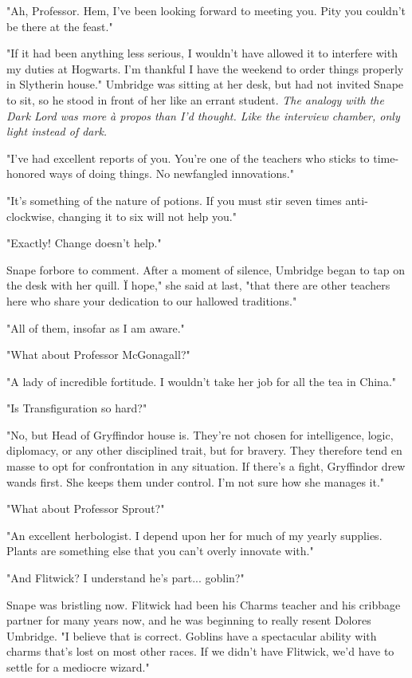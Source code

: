 \documentclass[a4paper,11pt]{article}
\begin{document}
"Ah, Professor. Hem, I've been looking forward to meeting you. Pity you couldn't be there at the feast."

"If it had been anything less serious, I wouldn't have allowed it to interfere with my duties at Hogwarts. I'm thankful I have the weekend to order things properly in Slytherin house." Umbridge was sitting at her desk, but had not invited Snape to sit, so he stood in front of her like an errant student. \emph{The analogy with the Dark Lord was more à propos than I'd thought. Like the interview chamber, only light instead of dark.}

"I've had excellent reports of you. You're one of the teachers who sticks to time-honored ways of doing things. No newfangled innovations."

"It's something of the nature of potions. If you must stir seven times anti-clockwise, changing it to six will not help you."

"Exactly! Change doesn't help."

Snape forbore to comment. After a moment of silence, Umbridge began to tap on the desk with her quill. Ï hope," she said at last, "that there are other teachers here who share your dedication to our hallowed traditions."

"All of them, insofar as I am aware."

"What about Professor McGonagall?"

"A lady of incredible fortitude. I wouldn't take her job for all the tea in China."

"Is Transfiguration so hard?"

"No, but Head of Gryffindor house is. They're not chosen for intelligence, logic, diplomacy, or any other disciplined trait, but for bravery. They therefore tend en masse to opt for confrontation in any situation. If there's a fight, Gryffindor drew wands first. She keeps them under control. I'm not sure how she manages it."

"What about Professor Sprout?"

"An excellent herbologist. I depend upon her for much of my yearly supplies. Plants are something else that you can't overly innovate with."

"And Flitwick? I understand he's part... goblin?"

Snape was bristling now. Flitwick had been his Charms teacher and his cribbage partner for many years now, and he was beginning to really resent Dolores Umbridge. "I believe that is correct. Goblins have a spectacular ability with charms that's lost on most other races. If we didn't have Flitwick, we'd have to settle for a mediocre wizard."
\end{document}
